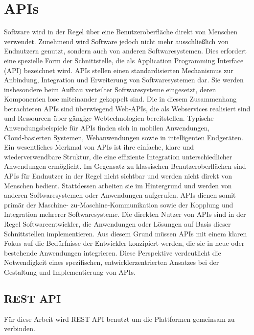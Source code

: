 \section{APIs}%
Software wird in der Regel über eine Benutzeroberfläche direkt von Menschen verwendet. Zunehmend wird Software jedoch nicht mehr ausschließlich von Endnutzern genutzt, sondern auch von anderen Softwaresystemen. Dies erfordert eine spezielle Form der Schnittstelle, die als Application Programming Interface (API) bezeichnet wird.
APIs stellen einen standardisierten Mechanismus zur Anbindung, Integration und Erweiterung von Softwaresystemen dar. Sie werden insbesondere beim Aufbau verteilter Softwaresysteme eingesetzt, deren Komponenten lose miteinander gekoppelt sind. Die in diesem Zusammenhang betrachteten APIs sind überwiegend Web‑APIs, die als Webservices realisiert sind und Ressourcen über gängige Webtechnologien bereitstellen. Typische Anwendungsbeispiele für APIs finden sich in mobilen Anwendungen, Cloud‑basierten Systemen, Webanwendungen sowie in intelligenten Endgeräten.
Ein wesentliches Merkmal von APIs ist ihre einfache, klare und wiederverwendbare Struktur, die eine effiziente Integration unterschiedlicher Anwendungen ermöglicht. Im Gegensatz zu klassischen Benutzeroberflächen sind APIs für Endnutzer in der Regel nicht sichtbar und werden nicht direkt von Menschen bedient. Stattdessen arbeiten sie im Hintergrund und werden von anderen Softwaresystemen oder Anwendungen aufgerufen. APIs dienen somit primär der Maschine‑ zu‑Maschine‑Kommunikation sowie der Kopplung und Integration mehrerer Softwaresysteme.
Die direkten Nutzer von APIs sind in der Regel Softwareentwickler, die Anwendungen oder Lösungen auf Basis dieser Schnittstellen implementieren. Aus diesem Grund müssen APIs mit einem klaren Fokus auf die Bedürfnisse der Entwickler konzipiert werden, die sie in neue oder bestehende Anwendungen integrieren. Diese Perspektive verdeutlicht die Notwendigkeit eines spezifischen, entwicklerzentrierten Ansatzes bei der Gestaltung und Implementierung von APIs. \cite{gu2016deep}
\subsection{REST API}
Für diese Arbeit wird REST API benutzt um die Plattformen gemeinsam zu verbinden.

